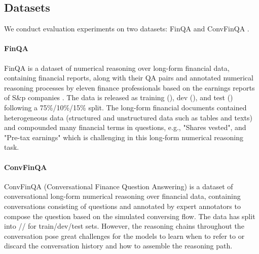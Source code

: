 \documentclass[11pt]{article}
\begin{document}
\subsection{Datasets}
We conduct evaluation experiments on two datasets: FinQA \cite{chen2021finqa} and ConvFinQA \cite{convfinqa}.

\paragraph{FinQA}
FinQA is a dataset of numerical reasoning over long-form financial data, containing  financial reports, along with their QA pairs and annotated numerical reasoning processes by eleven finance professionals based on the earnings reports of S\&p  companies \cite{zheng2021global}. The data is released as training (), dev (), and test () following a 75\%/10\%/15\% split. The long-form financial documents contained heterogeneous data (structured and unstructured data such as tables and texts) and compounded many financial terms in questions, e.g., "Shares vested", and "Pre-tax earnings" which is challenging in this long-form numerical reasoning task.

\paragraph{ConvFinQA}
ConvFinQA (Conversational Finance Question Answering) is a dataset of conversational long-form numerical reasoning over financial data, containing  conversations consisting of  questions and annotated by expert annotators to compose the question based on the simulated conversing flow. The data has split into // for train/dev/test sets. However, the reasoning chains throughout the conversation pose great challenges for the models to learn when to refer to or discard the conversation history and how to assemble the reasoning path.

\end{document}
